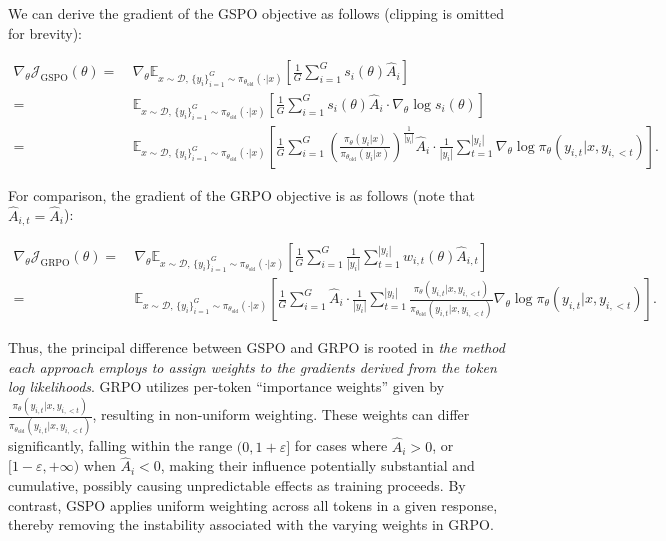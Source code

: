 We can derive the gradient of the GSPO objective as follows (clipping is omitted for brevity):

\begin{align}
\nabla_{\theta} \mathcal{J}_\text{GSPO} (\theta)
=&\ 
\nabla_{\theta} \mathbb{E}_{ x \sim \mathcal{D},\, \{y_i\}_{i=1}^G \sim \pi_{\theta_\text{old}}( \cdot | x) }
\left[ 
\frac{1}{G} \sum_{i=1}^{G} s_{i}(\theta) \widehat{A}_{i}
\right] \\
= &\ 
\mathbb{E}_{ x \sim \mathcal{D},\, \{y_i\}_{i=1}^G \sim \pi_{\theta_\text{old}}( \cdot | x) }
\left[ 
\frac{1}{G} \sum_{i=1}^{G}
s_{i}(\theta) \widehat{A}_{i}
\cdot \nabla_{\theta} \log s_{i}(\theta)
\right] \\
=&\ 
\mathbb{E}_{ x \sim \mathcal{D},\, \{y_i\}_{i=1}^G \sim \pi_{\theta_\text{old}}( \cdot | x) }
\left[ 
\frac{1}{G} \sum_{i=1}^{G} 
\left( \frac{ \pi_{\theta} (y_i | x) }{ \pi_{\theta_\text{old}} (y_i | x)} \right)^{\frac{1}{|y_i|}} \widehat{A}_{i} 
\cdot \frac{1}{|y_i|} \sum_{t=1}^{|y_i|} \nabla_{\theta} \log \pi_{\theta} (y_{i,t} | x, y_{i,<t}) 
\right].
\label{equ:gspo_grad}
\end{align}

For comparison, the gradient of the GRPO objective is as follows (note that $\widehat{A}_{i,t} = \widehat{A}_{i}$):

\begin{align}
\nabla_{\theta} \mathcal{J}_\text{GRPO} (\theta) 
=&\ 
\nabla_{\theta} \mathbb{E}_{ x \sim \mathcal{D},\, \{y_i\}_{i=1}^G \sim \pi_{\theta_\text{old}}( \cdot | x) }
\left[ \frac{1}{G} \sum_{i=1}^{G} \frac{1}{|y_i|} \sum_{t=1}^{|y_i|} 
w_{i,t}(\theta) \widehat{A}_{i,t}
\right] \\
=&\
\mathbb{E}_{ x \sim \mathcal{D},\, \{y_i\}_{i=1}^G \sim \pi_{\theta_\text{old}}( \cdot | x) }
\left[ \frac{1}{G} \sum_{i=1}^{G} \widehat{A}_{i} 
\cdot \frac{1}{|y_i|} \sum_{t=1}^{|y_i|} 
\frac{ \pi_{\theta} (y_{i,t} | x, y_{i,<t}) }{ \pi_{\theta_\text{old}} (y_{i,t} | x,y_{i,<t})} 
\nabla_{\theta} \log \pi_{\theta} (y_{i,t} | x, y_{i,<t})  
\right].
\end{align}

Thus, the principal difference between GSPO and GRPO is rooted in \textit{the method each approach employs to assign weights to the gradients derived from the token log likelihoods}. GRPO utilizes per-token ``importance weights'' given by $\frac{ \pi_{\theta} (y_{i,t} | x, y_{i,<t}) }{ \pi_{\theta_\text{old}} (y_{i,t} | x,y_{i,<t})}$, resulting in non-uniform weighting. These weights can differ significantly, falling within the range $(0, 1+\varepsilon]$ for cases where $\widehat{A}_{i} >0$, or $[1-\varepsilon, +\infty)$ when $\widehat{A}_{i} < 0$, making their influence potentially substantial and cumulative, possibly causing unpredictable effects as training proceeds. By contrast, GSPO applies uniform weighting across all tokens in a given response, thereby removing the instability associated with the varying weights in GRPO.

